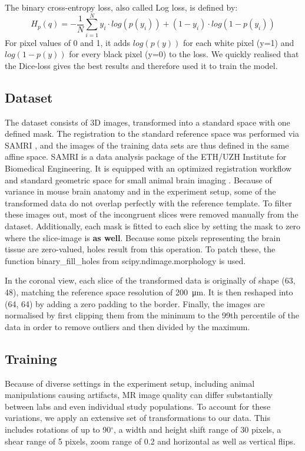 \documentclass{article}
\begin{document}
The binary cross-entropy loss, also called Log loss, is defined by:
$$H_p (q) = -\frac{1}{N} \sum ^N _{i=1} y_i \cdot log(p(y_i))+(1-y_i) \cdot log(1-p(y_i))$$
For pixel values of 0 and 1, it adds $log(p(y))$ for each white pixel (y=1) and $log(1-p(y))$ for every black pixel (y=0) to the loss.
We quickly realised that the Dice-loss gives the best results and therefore used it to train the model. 




\subsection{Dataset}
The dataset consists of 3D images, transformed into a standard space with one defined mask.
The registration to the standard reference space was performed via SAMRI \cite{noauthor_ibt-fmi/samri_2019}, and the images of the training data sets are thus defined in the same affine space.
SAMRI is a data analysis package of the ETH/UZH Institute for Biomedical Engineering.
It is equipped with an optimized registration workflow and standard geometric space for small animal brain imaging \cite{ioanas_optimized_2019}.
Because of variance in mouse brain anatomy and in the experiment setup, some of the transformed data do not overlap perfectly with the reference template.
To filter these images out, most of the incongruent slices were removed manually from the dataset.
Additionally, each mask is fitted to each slice by setting the mask to zero where the slice-image is \textbf{as well}.
Because some pixels representing the brain tissue are zero-valued, holes result from this operation.
To patch these, the function binary\_fill\_holes from scipy.ndimage.morphology \cite{noauthor_multi-dimensional_nodate} is used.

In the coronal view, each slice of the transformed data is originally of shape (63, 48), matching the reference space resolution of \SI{200}{\micro\metre}.
It is then reshaped into (64, 64) by adding a zero padding to the border.
Finally, the images are normalised by first clipping them from the minimum to the 99th percentile of the data in order to remove outliers and then divided by the maximum.

\subsection{Training}


Because of diverse settings in the experiment setup, including animal manipulations causing artifacts, MR image quality can differ substantially between labs and even individual study populations.
To account for these variations, we apply an extensive set of transformations to our data.
This includes rotations of up to 90$^{\circ}$, a width and height shift range of 30 pixels, a shear range of 5 pixels, zoom range of 0.2 and horizontal as well as vertical flips.
\end{document}
